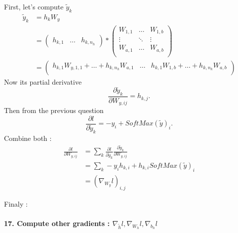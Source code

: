 \documentclass{article}
\theoremstyle{plain}%
\theoremstyle{definition}
\theoremstyle{remark}
\begin{document}
First, let's compute $ \tilde{y}_k $ 
\begin{align*}
    \tilde{y}_k &= h_k W_y \\
    &= \begin{pmatrix}
        h_{k,1} & \dots & h_{k,n_h}
    \end{pmatrix} * \begin{pmatrix}
        W_{1, 1} & \dots  & W_{1, b} \\
        \vdots   & \ddots  & \vdots \\
        W_{a, 1}  & \dots  & W_{a, b} \\
    \end{pmatrix} \\
    &= \begin{pmatrix}
        h_{k,1} W_{y, 1,1} + \dots + h_{k,n_h} W_{a,1}  & \dots & h_{k,1}W_{1,b} + \dots + h_{k, n_k} W_{a,b}\\
    \end{pmatrix} 
\end{align*}
Now its partial derivative
\[
    \frac{\partial \tilde{y}_k }{\partial W_{y,ij}} = h_{k, j} 
.\]
Then from the previous question
\[
    \frac{\partial l}{\partial \tilde{y}_k} = -y_i + SoftMax(\tilde{y})_i
.\]
Combine both : 
\begin{align*}
    \frac{\partial l}{\partial W_{y,ij}} &= \sum_{k}^{} \frac{\partial l}{\partial \tilde{y}_k} \frac{\partial \tilde{y}_k}{\partial W_{y,ij}} \\
        &= \sum_{k}^{} - y_i h_{k,i} + h_{k,i} SoftMax(\tilde{y})_i \\
        &= (\nabla _{W_y} l)_{i,j}
\end{align*}

Finaly : 


\paragraph{17. Compute other gradients : $ \nabla _{\tilde{h}} l, \nabla _{W_h} l, \nabla_{b_h}l $ }
\end{document}
